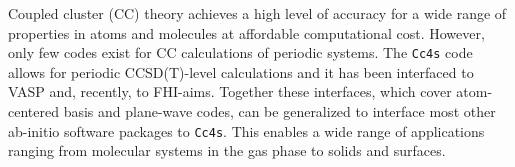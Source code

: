 \begin{poster}
{Coupled cluster (CC) theory achieves a high level of accuracy for a wide range of properties in atoms and molecules at affordable computational cost.
	However, only few codes exist for CC calculations of periodic systems. The \texttt{Cc4s} code~\cite{cc4s}
allows for periodic CCSD(T)-level calculations and it has been interfaced to
VASP\cite{kresse1996efficiency} and, recently, to FHI-aims\cite{moerman2022interface, fhiaims}.
Together these interfaces, which cover atom-centered basis and plane-wave codes, can be generalized to 
interface most other ab-initio software packages to \texttt{Cc4s}. This enables a wide range of applications ranging from molecular systems in the gas phase to solids and surfaces.
}

%    
%    
%    

\end{poster}
